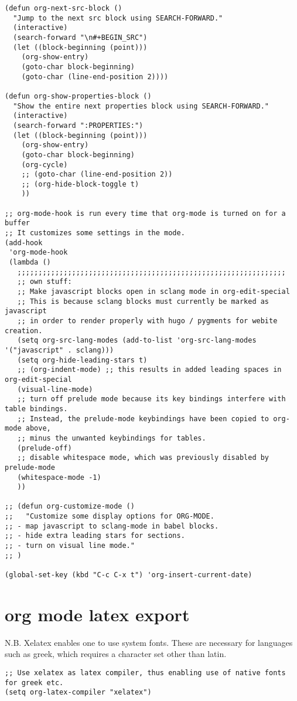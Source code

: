 \documentclass[11pt]{article}
\begin{document}
\begin{verbatim}
(defun org-next-src-block ()
  "Jump to the next src block using SEARCH-FORWARD."
  (interactive)
  (search-forward "\n#+BEGIN_SRC")
  (let ((block-beginning (point)))
    (org-show-entry)
    (goto-char block-beginning)
    (goto-char (line-end-position 2))))

(defun org-show-properties-block ()
  "Show the entire next properties block using SEARCH-FORWARD."
  (interactive)
  (search-forward ":PROPERTIES:")
  (let ((block-beginning (point)))
    (org-show-entry)
    (goto-char block-beginning)
    (org-cycle)
    ;; (goto-char (line-end-position 2))
    ;; (org-hide-block-toggle t)
    ))

;; org-mode-hook is run every time that org-mode is turned on for a buffer
;; It customizes some settings in the mode.
(add-hook
 'org-mode-hook
 (lambda ()
   ;;;;;;;;;;;;;;;;;;;;;;;;;;;;;;;;;;;;;;;;;;;;;;;;;;;;;;;;;;;;;;;;
   ;; own stuff:
   ;; Make javascript blocks open in sclang mode in org-edit-special
   ;; This is because sclang blocks must currently be marked as javascript
   ;; in order to render properly with hugo / pygments for webite creation.
   (setq org-src-lang-modes (add-to-list 'org-src-lang-modes '("javascript" . sclang)))
   (setq org-hide-leading-stars t)
   ;; (org-indent-mode) ;; this results in added leading spaces in org-edit-special
   (visual-line-mode)
   ;; turn off prelude mode because its key bindings interfere with table bindings.
   ;; Instead, the prelude-mode keybindings have been copied to org-mode above,
   ;; minus the unwanted keybindings for tables.
   (prelude-off)
   ;; disable whitespace mode, which was previously disabled by prelude-mode
   (whitespace-mode -1)
   ))

;; (defun org-customize-mode ()
;;   "Customize some display options for ORG-MODE.
;; - map javascript to sclang-mode in babel blocks.
;; - hide extra leading stars for sections.
;; - turn on visual line mode."
;; )

(global-set-key (kbd "C-c C-x t") 'org-insert-current-date)
\end{verbatim}
\section{org mode latex export}
\label{sec:org4f06dae}
N.B. Xelatex enables one to use system fonts. These are necessary for languages such as greek, which requires a character set other than latin.  


\begin{verbatim}
;; Use xelatex as latex compiler, thus enabling use of native fonts for greek etc.
(setq org-latex-compiler "xelatex")

\end{verbatim}
\end{document}
